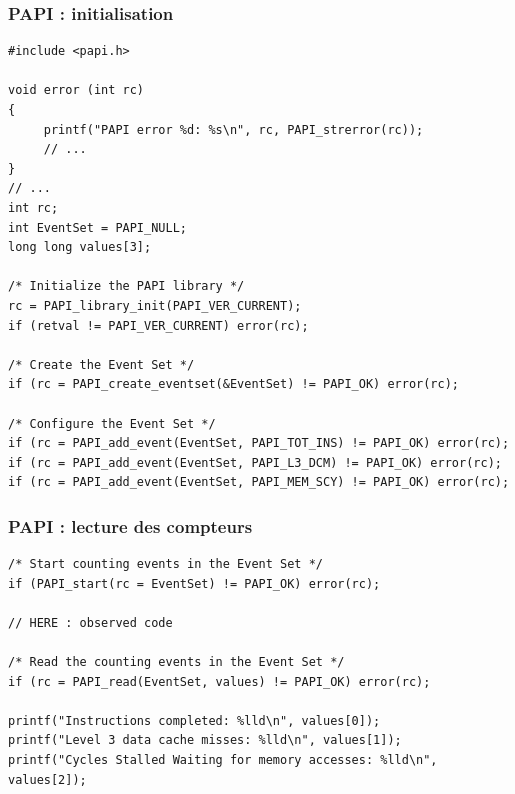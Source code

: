 \documentclass[xcolor={x11names,svgnames}]{beamer}
\begin{document}
  
\begin{frame}[fragile]
\frametitle{PAPI : initialisation}
\begin{verbatim}
#include <papi.h>

void error (int rc)
{
     printf("PAPI error %d: %s\n", rc, PAPI_strerror(rc));
     // ...
}
// ...
int rc;
int EventSet = PAPI_NULL;
long long values[3];

/* Initialize the PAPI library */
rc = PAPI_library_init(PAPI_VER_CURRENT);
if (retval != PAPI_VER_CURRENT) error(rc);

/* Create the Event Set */
if (rc = PAPI_create_eventset(&EventSet) != PAPI_OK) error(rc);

/* Configure the Event Set */
if (rc = PAPI_add_event(EventSet, PAPI_TOT_INS) != PAPI_OK) error(rc);
if (rc = PAPI_add_event(EventSet, PAPI_L3_DCM) != PAPI_OK) error(rc);
if (rc = PAPI_add_event(EventSet, PAPI_MEM_SCY) != PAPI_OK) error(rc);
\end{verbatim}
\end{frame}
  

\begin{frame}[fragile]
  \frametitle{PAPI : lecture des compteurs}
  
\begin{verbatim}
/* Start counting events in the Event Set */
if (PAPI_start(rc = EventSet) != PAPI_OK) error(rc);

// HERE : observed code 

/* Read the counting events in the Event Set */
if (rc = PAPI_read(EventSet, values) != PAPI_OK) error(rc);

printf("Instructions completed: %lld\n", values[0]);
printf("Level 3 data cache misses: %lld\n", values[1]);
printf("Cycles Stalled Waiting for memory accesses: %lld\n", values[2]);
\end{verbatim}

\end{frame}
  
\end{document}
